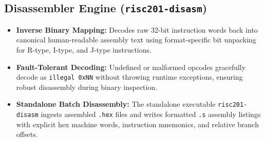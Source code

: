 \documentclass[11pt,a4paper]{article}
\begin{document}
\subsection{Disassembler Engine (\texttt{risc201-disasm})}
\begin{itemize}
    \item \textbf{Inverse Binary Mapping:} Decodes raw 32-bit instruction words back into canonical human-readable assembly text using format-specific bit unpacking for R-type, I-type, and J-type instructions.
    \item \textbf{Fault-Tolerant Decoding:} Undefined or malformed opcodes gracefully decode as \texttt{illegal 0xNN} without throwing runtime exceptions, ensuring robust disassembly during binary inspection.
    \item \textbf{Standalone Batch Disassembly:} The standalone executable \texttt{risc201-disasm} ingests assembled \texttt{.hex} files and writes formatted \texttt{.s} assembly listings with explicit hex machine words, instruction mnemonics, and relative branch offsets.
\end{itemize}
\end{document}

